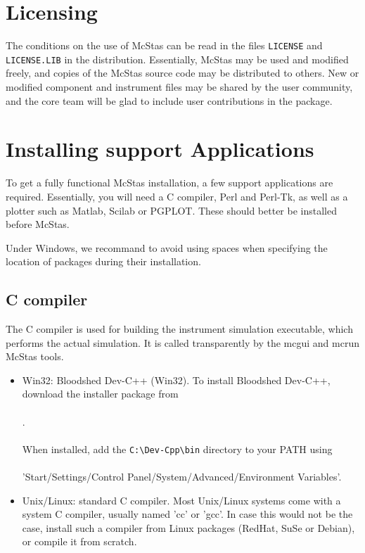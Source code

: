 \label{s:install}
\section{Licensing}
The conditions on the use of McStas can be read in the files
\verb+LICENSE+ and \verb+LICENSE.LIB+ in the distribution. Essentially,
McStas may be used and modified freely, and copies of the McStas source code
may be distributed to others.
New or modified component and instrument files may be shared by
the user community, and the core team will be glad to include user contributions in the package.

\section{Installing support Applications}

To get a fully functional McStas installation, a few support applications are required. Essentially, you will need a C compiler, Perl and Perl-Tk, as well as a plotter such as Matlab, Scilab or PGPLOT. These should better be installed before McStas.

Under Windows, we recommand to avoid using spaces when specifying the location of packages during their installation.

\subsection{C compiler}
\label{s:Ccompiler}

The C compiler is used for building the instrument simulation
executable, which performs the actual simulation. It is called transparently by the mcgui and mcrun McStas tools.

\begin{itemize}
\item{Win32: Bloodshed Dev-C++ (Win32).
  \label{s:instblood}
  To install Bloodshed Dev-C++, download the installer package from
  \\\
  \\.\\\
  \\
  When installed, add the \verb+C:\Dev-Cpp\bin+ directory to your PATH
  using\\\ \\
  'Start/Settings/Control Panel/System/Advanced/Environment Variables'.
}
\item{Unix/Linux: standard C compiler.
  Most Unix/Linux systems come with a system C compiler, usually named 'cc' or 'gcc'. In case this would not be the case, install such a compiler from Linux packages (RedHat, SuSe or Debian), or compile it from scratch.
}
\end{itemize}

